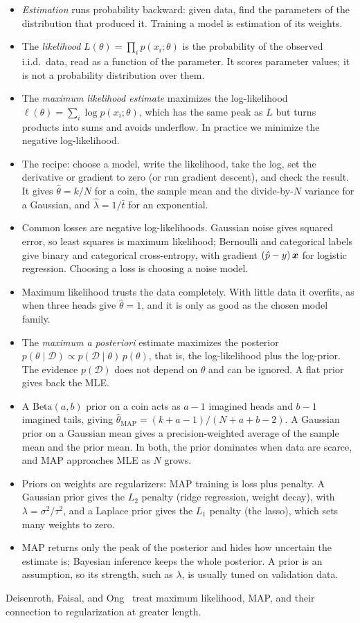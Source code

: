 \begin{itemize}
  \item \emph{Estimation} runs probability backward: given data, find the
    parameters of the distribution that produced it. Training a model is
    estimation of its weights.
  \item The \emph{likelihood} $L(\theta) = \prod_i p(x_i; \theta)$ is the
    probability of the observed i.i.d.\ data, read as a function of the
    parameter. It scores parameter values; it is not a probability
    distribution over them.
  \item The \emph{maximum likelihood estimate} maximizes the
    log-likelihood $\ell(\theta) = \sum_i \log p(x_i; \theta)$, which has
    the same peak as $L$ but turns products into sums and avoids
    underflow. In practice we minimize the negative log-likelihood.
  \item The recipe: choose a model, write the likelihood, take the log,
    set the derivative or gradient to zero (or run gradient descent), and
    check the result. It gives $\hat\theta = k/N$ for a coin, the sample
    mean and the divide-by-$N$ variance for a Gaussian, and $\hat\lambda =
    1/\bar{t}$ for an exponential.
  \item Common losses are negative log-likelihoods. Gaussian noise gives
    squared error, so least squares is maximum likelihood; Bernoulli and
    categorical labels give binary and categorical cross-entropy, with
    gradient $(\hat{p} - y)\,\bm{x}$ for logistic regression. Choosing
    a loss is choosing a noise model.
  \item Maximum likelihood trusts the data completely. With little data
    it overfits, as when three heads give $\hat\theta = 1$, and it is
    only as good as the chosen model family.
  \item The \emph{maximum a posteriori} estimate maximizes the posterior
    $p(\theta \mid \mathcal{D}) \propto p(\mathcal{D} \mid \theta)\,
    p(\theta)$, that is, the log-likelihood plus the log-prior. The
    evidence $p(\mathcal{D})$ does not depend on $\theta$ and can be
    ignored. A flat prior gives back the MLE.
  \item A $\text{Beta}(a, b)$ prior on a coin acts as $a - 1$ imagined
    heads and $b - 1$ imagined tails, giving $\hat\theta_{\text{MAP}} =
    (k + a - 1)/(N + a + b - 2)$. A Gaussian prior on a Gaussian mean
    gives a precision-weighted average of the sample mean and the prior
    mean. In both, the prior dominates when data are scarce, and MAP
    approaches MLE as $N$ grows.
  \item Priors on weights are regularizers: MAP training is loss plus
    penalty. A Gaussian prior gives the $L_2$ penalty (ridge regression,
    weight decay), with $\lambda = \sigma^2/\tau^2$, and a Laplace prior
    gives the $L_1$ penalty (the lasso), which sets many weights to zero.
  \item MAP returns only the peak of the posterior and hides how
    uncertain the estimate is; Bayesian inference keeps the whole
    posterior. A prior is an assumption, so its strength, such as
    $\lambda$, is usually tuned on validation data.
\end{itemize}

Deisenroth, Faisal, and Ong~\cite{deisenroth2020mml} treat maximum
likelihood, MAP, and their connection to regularization at greater
length.
